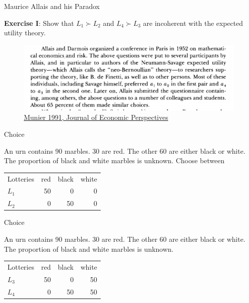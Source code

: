 \documentclass[handout]{beamer}
\begin{document}
\begin{frame}{Maurice Allais and his Paradox}

\textbf{Exercise I}: Show that $L_1 \succ L_2$ and $L_4 \succ L_3$ are incoherent with the expected utility theory. 

\begin{figure}
\centering
\includegraphics[scale=0.5]{allais.png}
\caption{\href{https://pubs.aeaweb.org/doi/pdf/10.1257/jep.5.2.179}{Munier 1991, Journal of Economic Perspectives}}
\end{figure}

\end{frame}

\begin{frame}{Choice}

An urn contains 90 marbles. 30 are red. The other 60 are either black or white. The proportion of black and white marbles is unknown. 
Choose between
\begin{table}[H]
\begin{tabular}{lrrr}
\hline \hline
Lotteries & red & black & white \\
$L_1$ & 50 & 0 & 0 \\
$L_2$ & 0 & 50 & 0 \\
\hline \hline 
\end{tabular}
\end{table} 

\end{frame}

\begin{frame}{Choice}

An urn contains 90 marbles. 30 are red. The other 60 are either black or white. The proportion of black and white marbles is unknown.

\begin{table}[H]
\begin{tabular}{lrrr}
\hline \hline
Lotteries & red & black & white \\
$L_3$ & 50 & 0 & 50 \\
$L_4$ & 0 & 50 & 50 \\
\hline \hline 
\end{tabular}
\end{table} 
\pause

\end{frame}
\end{document}
